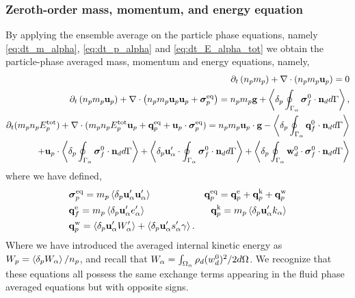 \subsubsection{Zeroth-order mass, momentum, and energy equation}
By applying the ensemble average on the particle phase equations, namely \ref{eq:dt_m_alpha}, \ref{eq:dt_p_alpha} and \ref{eq:dt_E_alpha_tot} we obtain the particle-phase averaged mass, momentum and energy equations, namely, 
\begin{align}
    \label{eq:dt_hybrid_mp}
    \pddt \left(n_p m_p\right)
    + \div \left(n_pm_p\textbf{u}_p
    \right)
    = 
    0\\
    \label{eq:dt_hybrid_up}
    \pddt \left(n_p m_p \textbf{u}_p\right)
    + \div \left(n_p
    m_p \textbf{u}_p \textbf{u}_p 
    + \bm{\sigma}_p^\text{eq}
    \right)
    = 
    n_p m_p \textbf{g}
    + \pSavg{{\bm{\sigma}_f^0 \cdot \textbf{n}_d}},\\
    \label{eq:dt_hybrid_Ep}
    \pddt(m_p n_pE_p^\text{tot})
    + \div(m_pn_p E_p^\text{tot} \textbf{u}_p 
    + \textbf{q}_p^\text{eq} 
    + \textbf{u}_p \cdot \bm{\sigma}_p^\text{eq})
    =  n_p m_p \textbf{u}_p\cdot  \textbf{g}
    -  \pSavg{\textbf{q}_f^0 \cdot \textbf{n}_d}\nonumber\\
    + \textbf{u}_p \cdot\pSavg{{\bm{\sigma}_f^0 \cdot \textbf{n}_d}}
    + \pavg{\textbf{u}_\alpha' \cdot\intS{\bm{\sigma}_f^0 \cdot \textbf{n}_d}}
    + \pSavg{{\textbf{w}_d^0 \cdot\bm{\sigma}_f^0 \cdot \textbf{n}_d}}
\end{align}
where we have defined, 
\begin{align*}
    &\bm{\sigma}_p^\text{eq}
    =  m_p\left<\delta_p \textbf{u}_\alpha'\textbf{u}_\alpha'\right>
    &\textbf{q}_p^\text{eq}
    =\textbf{q}_p^\text{e} 
    +\textbf{q}_p^\text{k}  
    +\textbf{q}_p^\text{w}  
    \\
    &\textbf{q}_f^\text{e}
    = m_p \left<\delta_p \textbf{u}_\alpha' e_\alpha'\right> 
    &\textbf{q}_p^\text{k}
    = m_p \left<\delta_p \textbf{u}_\alpha' k_\alpha\right> 
    \\
    &\textbf{q}_p^\text{w}
    = 
     \left<\delta_p \textbf{u}_\alpha'W_\alpha'\right>
    + \left<\delta_p \textbf{u}_\alpha' s_\alpha' \gamma\right>.
\end{align*}
Where we have introduced the averaged internal kinetic energy as $W_p = \left<\delta_p W_\alpha\right>/n_p$, and recall that $W_\alpha = \int_{\Omega_{\alpha}} \rho_d  (w_d^0)^2/2 d\Omega$. 
We recognize that these equations all possess the same exchange terms appearing in the fluid phase averaged equations but with opposite signs. 
